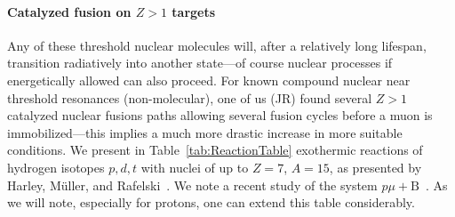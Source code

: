 \documentclass[particles,article,accept,pdftex,moreauthors]{Definitions/mdpi}
\newcommand{\rt}[1]{Table~\ref{#1}}
\begin{document}
\paragraph*{\bf Catalyzed fusion on $Z>1$ targets}
Any of these threshold nuclear molecules will, after a relatively long lifespan, transition radiatively into another state---of course nuclear processes if energetically allowed can also proceed. For known compound nuclear near threshold resonances (non-molecular), one of us (JR) found several $Z>1$ catalyzed nuclear fusions paths allowing several fusion cycles before a muon is immobilized---this implies a much more drastic increase in more suitable conditions. We present in \rt{tab:ReactionTable} exothermic reactions of hydrogen isotopes $p,d,t$ with nuclei of up to $Z = 7$, $A = 15$, as presented by Harley, M{\"u}ller, and Rafelski~\cite{Harley:1988wp}. We note a recent study of the system $p\mu+\mathrm{B}$~\cite{Wang:2026zuj}. As we will note, especially for protons, one can extend this table considerably.
\end{document}
